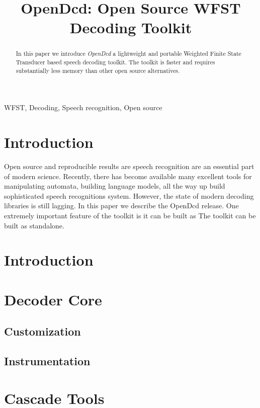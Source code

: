 \documentclass{article}
\title{OpenDcd: Open Source WFST Decoding Toolkit}
\begin{document}
%
\maketitle
%
\begin{abstract}
In this paper we introduce \emph{OpenDcd} a lightweight and portable Weighted Finite State
Transducer based speech decoding toolkit. The toolkit is faster and requires
substantially less memory than other open source alternatives.
\end{abstract}
%
\begin{keywords}
WFST, Decoding, Speech recognition, Open source
\end{keywords}
%
\section{Introduction}
\label{sec:intro}


Open source and reproducible results are speech recognition are an essential
part of modern science. Recently, there has become available many excellent
tools for manipulating automata, building language models, all the way up
build sophisticated speech recognitions system.  However, the state of modern 
decoding libraries is still lagging. In this paper we describe the OpenDcd release. 
One extremely important feature of the toolkit is it can be built as 
The toolkit can be built as standalone.

\section{Introduction}
\label{sec:format}

\section{Decoder Core}
\label{sec:decodercore}

\subsection{Customization}
\label{sec:}

\subsection{Instrumentation}
\label{sec:instrumentation}

\section{Cascade Tools}
\label{sec:cascade}
\end{document}
